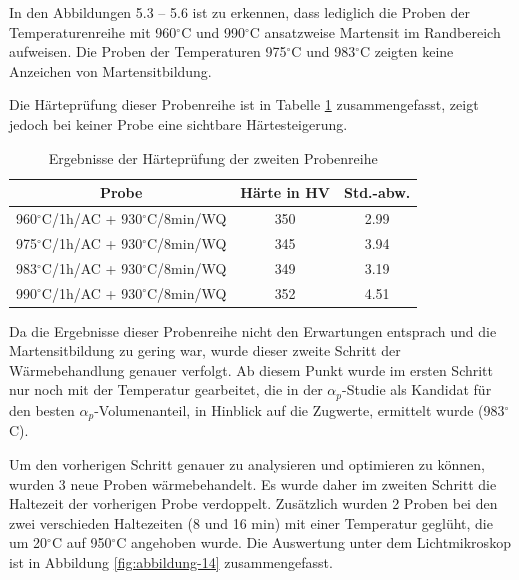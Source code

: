 In den Abbildungen 5.3 -- 5.6 ist zu erkennen, dass lediglich die Proben der Temperaturenreihe mit 960$^\circ$C und 990$^\circ$C ansatzweise Martensit im Randbereich aufweisen. Die Proben der Temperaturen 975$^\circ$C und 983$^\circ$C zeigten keine Anzeichen von Martensitbildung.

Die Härteprüfung dieser Probenreihe ist in Tabelle \ref{Tabelle 6} zusammengefasst, zeigt jedoch bei keiner Probe eine sichtbare Härtesteigerung.

\begin{table}[h]
	\centering
	\begin{tabular}{|c|c|c|}
		\hline 
		Probe & Härte in HV &  Std.-abw. \\ 
		\hline 
		960$^\circ$C/1h/AC + 930$^\circ$C/8min/WQ & 350 & 2.99 \\ 
		\hline 
		975$^\circ$C/1h/AC + 930$^\circ$C/8min/WQ & 345 & 3.94 \\ 
		\hline 
		983$^\circ$C/1h/AC + 930$^\circ$C/8min/WQ & 349 & 3.19 \\ 
		\hline 
		990$^\circ$C/1h/AC + 930$^\circ$C/8min/WQ & 352 & 4.51 \\ 
		\hline 
    \end{tabular} 
	\caption{Ergebnisse der Härteprüfung der zweiten Probenreihe}
	\label{Tabelle 6}
\end{table}

Da die Ergebnisse dieser Probenreihe nicht den Erwartungen entsprach und die Martensitbildung zu gering war, wurde dieser zweite Schritt der Wärmebehandlung genauer verfolgt. Ab diesem Punkt wurde im ersten Schritt nur noch mit der Temperatur gearbeitet, die in der $\alpha_p$-Studie als Kandidat für den besten $\alpha_p$-Volumenanteil, in Hinblick auf die Zugwerte, ermittelt wurde (983$^\circ$C). 

Um den vorherigen Schritt genauer zu analysieren und optimieren zu können, wurden 3 neue Proben wärmebehandelt. Es wurde daher im zweiten Schritt die Haltezeit der vorherigen Probe verdoppelt. Zusätzlich wurden 2 Proben bei den zwei verschieden Haltezeiten (8 und 16 min) mit einer Temperatur geglüht, die um 20$^\circ$C auf 950$^\circ$C angehoben wurde. Die Auswertung unter dem Lichtmikroskop ist in Abbildung \ref{fig:abbildung-14} zusammengefasst. 

